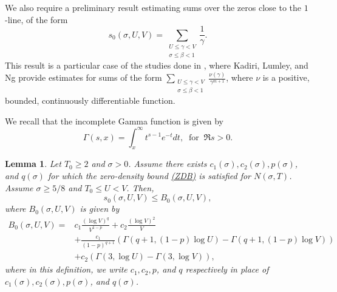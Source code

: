 \documentclass[10pt]{amsart}
\newcommand{\s}{\sigma}
\newtheorem{lem}[prop]{Lemma}
\theoremstyle{definition}
\numberwithin{equation}{section}
\begin{document}
We also require a preliminary result estimating sums over the zeros close to the $1$-line, of the form
\begin{equation}
\label{def-s0}
s_0(\s, U,V) = \sum_{\substack{U \le \gamma < V \\ \s \le \beta < 1}} \frac{1}{\gamma} .
\end{equation}
This result is a particular case of the studies done in \cite{KLN20+}, where Kadiri, Lumley, and Ng provide estimates for sums of the form $\sum_{\substack{U \le \gamma < V \\ \s \le \beta < 1}} \frac{\nu(\gamma)}{\gamma^{m+1}}$, where $\nu$ is a positive, bounded, continuously differentiable function. 

We recall that the incomplete Gamma function is given by 
\begin{equation}\label{def-Gamma}
\Gamma(s,x) = \int_x^{\infty} t^{s-1} e^{-t} dt, \ \text{ for }\ \Re s>0.
\end{equation}
\begin{lem} %
\label{B4Bound}
Let $T_0\ge 2$ and $\s>0$.
Assume there exists $c_1(\s),c_2(\s),p(\sigma)$, and $q(\sigma)$ for which the zero-density bound \hyperref[ZDB]{(ZDB)} is satisfied for $N(\s,T) $.
Assume $\s \geq 5/8$ and $T_0 \le  U < V $. Then,
\begin{equation}\label{def-RS}
s_0(\s, U,V) %
\le  B_0(\s, U, V),
\end{equation}
where $B_0(\s, U, V)$ is given by 
\begin{equation}\label{def-B4}
\begin{split}
B_0(\s, U, V) = 
& c_1  \frac{ (\log V )^{q }}{V^{1-p }} + c_2  \frac{(\log V)^2}{V}
\\&+ \frac{c_1}{(1-p)^{q+1} } \left( \Gamma(q+1,(1-p)\log U)  - \Gamma(q+1,(1-p)\log V)\right)
\\&+ c_2 \left(  \Gamma(3, \log U)- \Gamma(3, \log V)\right),
\end{split}
\end{equation}
where in this definition, we write $c_1,c_2, p$, and $q$ respectively in place of $c_1(\sigma),c_2(\sigma),p(\sigma)$, and $q(\sigma)$.
\end{lem}
%
\end{document}
